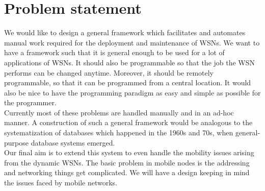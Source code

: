 \documentclass[twocolumn]{article}
\begin{document}
\section{Problem statement}
We would like to design a general framework which facilitates and automates manual work required for the deployment and maintenance of WSNs. We want to have a framework such that it is general enough to be used for a lot of applications of WSNs. It should also be programmable so that the job the WSN performs can be changed anytime. Moreover, it should be remotely programmable, so that it can be programmed from a central location. It would also be nice to have the programming paradigm as easy and simple as possible for the programmer.\\
Currently most of these problems are handled manually and in an ad-hoc manner. A construction of such a general framework would be analogous to the systematization of databases which happened in the 1960s and 70s, when general-purpose database systems emerged.\\
Our final aim is to extend this system to even handle the mobility issues arising from the dynamic WSNs. The basic problem in mobile nodes is the addressing and networking things get complicated. We will have a design keeping in mind the issues faced by mobile networks.
\end{document}
